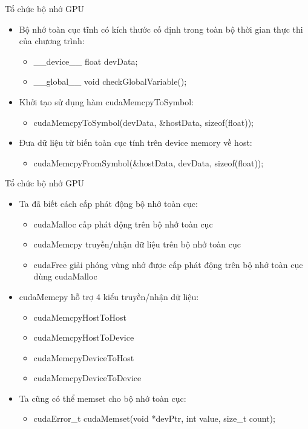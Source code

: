 \documentclass[10pt]{beamer}
\theoremstyle{remark}
\numberwithin{algocf}{section}
\numberwithin{equation}{section}
\numberwithin{dl}{section}
\numberwithin{figure}{section}
\begin{document}
\begin{frame}{Tổ chức bộ nhớ GPU}
    \begin{itemize}
        \item Bộ nhớ toàn cục tĩnh có kích thước cố định trong toàn bộ thời gian thực thi của chương trình:
        \begin{itemize}
            \item \_\_device\_\_ float devData;
            \item \_\_global\_\_ void checkGlobalVariable();
        \end{itemize}
        \item Khởi tạo sử dụng hàm cudaMemcpyToSymbol:
        \begin{itemize}
            \item cudaMemcpyToSymbol(devData, \&hostData, sizeof(float));
        \end{itemize}
        \item Đưa dữ liệu từ biến toàn cục tính trên device memory về host:
        \begin{itemize}
            \item cudaMemcpyFromSymbol(\&hostData, devData, sizeof(float));
        \end{itemize}
    \end{itemize}
\end{frame}

\begin{frame}{Tổ chức bộ nhớ GPU}
    \begin{itemize}
        \item Ta đã biết cách cấp phát động bộ nhớ toàn cục:
        \begin{itemize}
            \item cudaMalloc cấp phát động trên bộ nhớ toàn cục
            \item cudaMemcpy truyền/nhận dữ liệu trên bộ nhớ toàn cục 
            \item cudaFree giải phóng vùng nhớ được cấp phát động trên bộ nhớ toàn cục dùng cudaMalloc
        \end{itemize}
        \item cudaMemcpy hỗ trợ 4 kiểu truyền/nhận dữ liệu:
        \begin{itemize}
            \item cudaMemcpyHostToHost
            \item cudaMemcpyHostToDevice
            \item cudaMemcpyDeviceToHost
            \item cudaMemcpyDeviceToDevice
        \end{itemize}
        \item Ta cũng có thể memset cho bộ nhớ toàn cục:
        \begin{itemize}
            \item cudaError\_t cudaMemset(void *devPtr, int value, size\_t count);
            
        \end{itemize}
    \end{itemize}
\end{frame}
\end{document}

